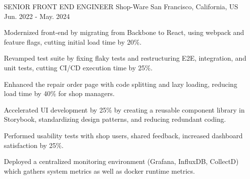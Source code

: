

\begin{cventries}

  \cventry
  {SENIOR FRONT END ENGINEER} %
  {Shop-Ware} %
  {San Francisco, California, US} %
  {Jun. 2022 - May. 2024} %
  {
    \begin{cvitems} %
      \item {Modernized front-end by migrating from Backbone to React, using webpack and feature flags, cutting initial load time by 20\%.}
      \item {Revamped test suite by fixing flaky tests and restructuring E2E, integration, and unit tests, cutting CI/CD execution time by 25\%.}
      \item {Enhanced the repair order page with code splitting and lazy loading, reducing load time by 40\% for shop managers.}
      \item {Accelerated UI development by 25\% by creating a reusable component library in Storybook, standardizing design patterns, and reducing redundant coding.}
      \item {Performed usability tests with shop users, shared feedback, increased dashboard satisfaction by 25\%.}
      \item {Deployed a centralized monitoring environment (Grafana, InfluxDB, CollectD) which gathers system metrics as well as docker runtime metrics.}
    \end{cvitems}
  }


\end{cventries}
